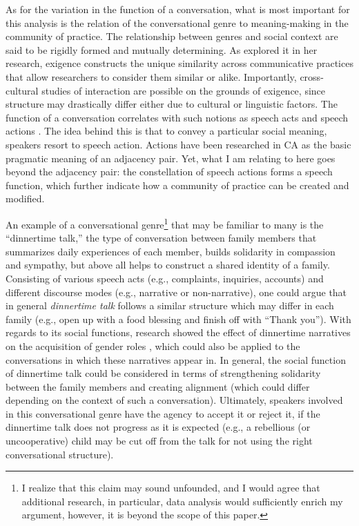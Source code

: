 \documentclass[12pt]{article}
\begin{document}
As for the variation in the function of a conversation, what is most important for this analysis is the relation of the conversational genre to meaning-making in the community of practice. The relationship between genres and social context are said to be rigidly formed and mutually determining. As \textcite{mayes2005} explored it in her research, exigence constructs the unique similarity across communicative practices that allow researchers to consider them similar or alike. Importantly, cross-cultural studies of interaction are possible on the grounds of exigence, since structure may drastically differ either due to cultural or linguistic factors. The function of a conversation correlates with such notions as speech acts \parencite{searle2011} and speech actions \parencite{levinson2013}. The idea behind this is that to convey a particular social meaning, speakers resort to speech action. Actions have been researched in CA as the basic pragmatic meaning of an adjacency pair. Yet, what I am relating to here goes beyond the adjacency pair: the constellation of speech actions forms a speech function, which further indicate how a community of practice can be created and modified.

An example of a conversational genre\footnote{I realize that this claim may sound unfounded, and I would agree that additional research, in particular, data analysis would sufficiently enrich my argument, however, it is beyond the scope of this paper.} that may be familiar to many is the ``dinnertime talk,'' the type of conversation between family members that summarizes daily experiences of each member, builds solidarity in compassion and sympathy, but above all helps to construct a shared identity of a family. Consisting of various speech acts (e.g., complaints, inquiries, accounts) and different discourse modes (e.g., narrative or non-narrative), one could argue that in general \textit{dinnertime talk} follows a similar structure which may differ in each family (e.g., open up with a food blessing and finish off with ``Thank you''). With regards to its social functions, research showed the effect of dinnertime narratives on the acquisition of gender roles \parencite{ochs2001}, which could also be applied to the conversations in which these narratives appear in. In general, the social function of dinnertime talk could be considered in terms of strengthening solidarity between the family members and creating alignment (which could differ depending on the context of such a conversation). Ultimately, speakers involved in this conversational genre have the agency to accept it or reject it, if the dinnertime talk does not progress as it is expected (e.g., a rebellious (or uncooperative) child may be cut off from the talk for not using the right conversational structure). 
\end{document}
